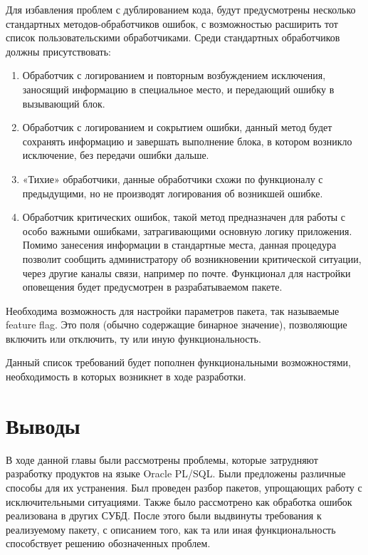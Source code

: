 Для избавления проблем с дублированием кода, будут предусмотрены несколько стандартных методов-обработчиков ошибок, с возможностью расширить тот список пользовательскими обработчиками. Среди стандартных обработчиков должны присутствовать:

\begin{enumerate}
\item Обработчик с логированием и повторным возбуждением исключения, заносящий информацию в специальное место, и передающий ошибку в вызывающий блок. 
\item Обработчик с логированием и сокрытием ошибки, данный метод будет сохранять информацию и завершать выполнение блока, в котором возникло исключение, без передачи ошибки дальше. 
\item «Тихие» обработчики, данные обработчики схожи по функционалу с предыдущими, но не производят логирования об возникшей ошибке. 
\item Обработчик критических ошибок, такой метод предназначен для работы с особо важными ошибками, затрагивающими основную логику приложения. Помимо занесения информации в стандартные места, данная процедура позволит сообщить администратору об возникновении критической ситуации, через другие каналы связи, например по почте. Функционал для настройки оповещения будет предусмотрен в разрабатываемом пакете. 
\end{enumerate} 


Необходима возможность для настройки параметров пакета, так называемые feature flag. Это поля (обычно содержащие бинарное значение), позволяющие включить или отключить, ту или иную функциональность. 

Данный список требований будет пополнен функциональными возможностями, необходимость в которых возникнет в ходе разработки.

\section{Выводы} \label{ch2:conclusion}
В ходе данной главы были рассмотрены проблемы, которые затрудняют разработку продуктов на языке Oracle PL/SQL. Были предложены различные способы для их устранения.
Был проведен разбор пакетов, упрощающих работу с исключительными ситуациями. Также было рассмотрено как обработка ошибок реализована в других СУБД. 
После этого были выдвинуты требования к реализуемому пакету, с описанием того, как та или иная функциональность способствует решению обозначенных проблем. 




%
\newpage %
